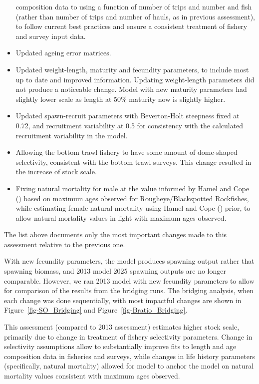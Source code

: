 \documentclass[
]{scrartcl}
\begin{document}
\begin{itemize}
  composition data to using a function of number of trips and number and
  fish (rather than number of trips and number of hauls, as in previous
  assessment), to follow current best practices and ensure a consistent
  treatment of fishery and survey input data.
\item
  Updated ageing error matrices.
\item
  Updated weight-length, maturity and fecundity parameters, to include
  most up to date and improved information. Updating weight-length
  parameters did not produce a noticeable change. Model with new
  maturity parameters had slightly lower scale as length at 50\%
  maturity now is slightly higher.
\item
  Updated spawn-recruit parameters with Beverton-Holt steepness fixed at
  0.72, and recruitment variability at 0.5 for consistency with the
  calculated recruitment variability in the model.
\item
  Allowing the bottom trawl fishery to have some amount of dome-shaped
  selectivity, consistent with the bottom trawl surveys. This change
  resulted in the increase of stock scale.
\item
  Fixing natural mortality for male at the value informed by Hamel and
  Cope () based on maximum
  ages observed for Rougheye/Blackspotted Rockfishes, while estimating
  female natural mortality using Hamel and Cope
  () prior, to allow natural
  mortality values in light with maximum ages observed.
\end{itemize}

The list above documents only the most important changes made to this
assessment relative to the previous one.

With new fecundity parameters, the model produces spawning output rather
that spawning biomass, and 2013 model 2025 spawning outputs are no
longer comparable. However, we ran 2013 model with new fecundity
parameters to allow for comparison of the results from the bridging
runs. The bridging analysis, when each change was done sequentially,
with most impactful changes are shown in Figure~\ref{fig-SO_Bridging}
and Figure~\ref{fig-Bratio_Bridging}.

This assessment (compared to 2013 assessment) estimates higher stock
scale, primarily due to change in treatment of fishery selectivity
parameters. Change in selectivity assumptions allow to substantially
improve fits to length and age composition data in fisheries and
surveys, while changes in life history parameters (specifically, natural
mortality) allowed for model to anchor the model on natural mortality
values consistent with maximum ages observed.
\end{document}
